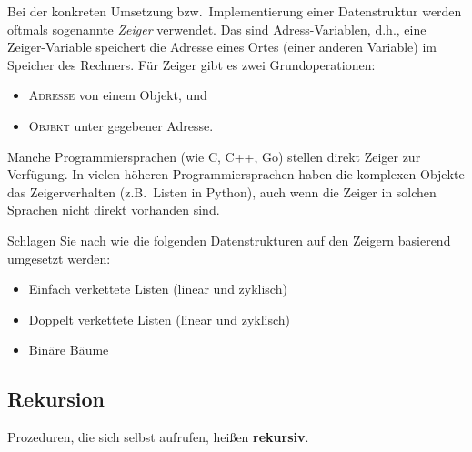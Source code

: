 \begin{bem} 
Bei der konkreten Umsetzung bzw.~Implementierung einer Datenstruktur werden oftmals sogenannte \emph{Zeiger} verwendet.
Das sind Adress-Variablen, d.h., eine Zeiger-Variable speichert die Adresse eines Ortes (einer anderen Variable) im Speicher des Rechners.
Für Zeiger gibt es zwei Grundoperationen: 
\begin{itemize}
	\item \textsc{Adresse} von einem Objekt, und 
	\item \textsc{Objekt} unter gegebener Adresse.
\end{itemize} 	
Manche Programmiersprachen (wie C, C++, Go) stellen direkt Zeiger zur Verfügung. 
	 In vielen höheren Programmiersprachen haben die komplexen Objekte das Zeigerverhalten (z.B.~Listen in Python), auch wenn die Zeiger in solchen Sprachen nicht direkt vorhanden sind. 
\end{bem} 


\begin{aufg} 
	Schlagen Sie nach wie die folgenden Datenstrukturen auf den Zeigern basierend umgesetzt werden: 
	\begin{itemize}
			\item Einfach verkettete Listen (linear und zyklisch)
			\item Doppelt verkettete Listen  (linear und zyklisch)
			\item Binäre Bäume
	\end{itemize} 
\end{aufg} 

\subsection{Rekursion}


\begin{defn}
	Prozeduren, die sich selbst aufrufen, heißen \textbf{rekursiv}. 
\end{defn} 

